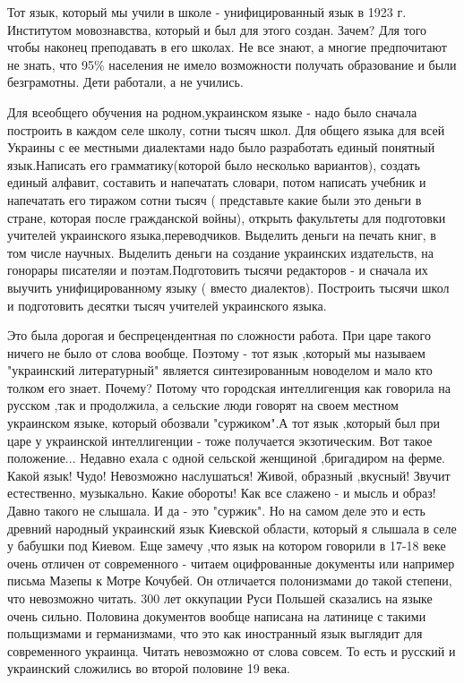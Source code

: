 \begin{itemize}
 

Тот язык, который мы учили в школе - унифицированный язык в 1923 г. Институтом
мовознавства, который и был для этого создан. Зачем? Для того чтобы наконец
преподавать в его школах. Не все знают, а многие предпочитают не знать, что 95\%
населения не имело возможности получать образование и были безграмотны. Дети
работали, а не учились.

Для всеобщего обучения на родном,украинском языке - надо было сначала построить
в каждом селе школу, сотни тысяч школ. Для общего языка для всей Украины с ее
местными диалектами надо было разработать единый понятный язык.Написать его
грамматику(которой было несколько вариантов), создать единый алфавит, составить
и напечатать словари, потом написать учебник и напечатать его тиражом сотни
тысяч ( представьте какие были это деньги в стране, которая после гражданской
войны), открыть факультеты для подготовки учителей украинского
языка,переводчиков. Выделить деньги на печать книг, в том числе научных.
Выделить деньги на создание украинских издательств, на гонорары писателяи и
поэтам.Подготовить тысячи редакторов - и сначала их выучить унифицированному
языку ( вместо диалектов). Построить тысячи школ и подготовить десятки тысяч
учителей украинского языка. 

Это была дорогая и беспрецендентная по сложности работа. При царе такого ничего
не было от слова вообще. Поэтому - тот язык ,который мы называем "украинский
литературный" является синтезированным новоделом и мало кто толком его знает.
Почему? Потому что городская интеллигенция как говорила на русском ,так и
продолжила, а сельские люди говорят на своем местном украинском языке, который
обозвали "суржиком".А тот язык ,который был при царе у украинской интеллигенции
- тоже получается экзотическим. Вот такое положение... Недавно ехала с одной
сельской женщиной ,бригадиром на ферме. Какой язык! Чудо! Невозможно
наслушаться! Живой, образный ,вкусный! Звучит естественно, музыкально. Какие
обороты! Как все слажено - и мысль и образ! Давно такого не слышала. И да - это
"суржик". Но на самом деле это и есть древний народный украинский язык Киевской
области, который я слышала в селе у бабушки под Киевом. Еще замечу ,что язык на
котором говорили в 17-18 веке очень отличен от современного - читаем
оцифрованные документы или например письма Мазепы к Мотре Кочубей. Он
отличается полонизмами до такой степени, что невозможно читать. 300 лет
оккупации Руси Польшей сказались на языке очень сильно. Половина документов
вообще написана на латинице с такими польщизмами и германизмами, что это как
иностранный язык выглядит для современного украинца. Читать невозможно от слова
совсем. То есть и русский и украинский сложились во второй половине 19 века.


\end{itemize}
